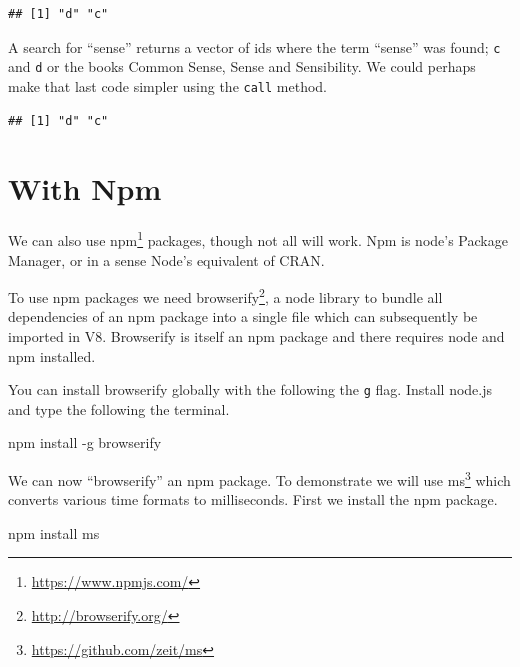 \documentclass[
]{krantz}
\makeatletter
\newenvironment{Shaded}{\begin{snugshade}}{\end{snugshade}}
\newcommand{\ExtensionTok}[1]{#1}
\newcommand{\KeywordTok}[1]{\textcolor[rgb]{0.27,0.27,0.27}{\textbf{#1}}}
\newcommand{\NormalTok}[1]{#1}
\newcommand{\OperatorTok}[1]{\textcolor[rgb]{0.43,0.43,0.43}{\textbf{#1}}}
\newcommand{\StringTok}[1]{\textcolor[rgb]{0.5,0.5,0.5}{#1}}
\renewcommand{\href}[2]{#2\footnote{\url{#1}}}
\newenvironment{kframe}{%
\medskip{}
\setlength{\fboxsep}{.8em}
 \def\at@end@of@kframe{}%
 \ifinner\ifhmode%
  \def\at@end@of@kframe{\end{minipage}}%
  \begin{minipage}{\columnwidth}%
 \fi\fi%
 \def\FrameCommand##1{\hskip\@totalleftmargin \hskip-\fboxsep
 \colorbox{shadecolor}{##1}\hskip-\fboxsep
     \hskip-\linewidth \hskip-\@totalleftmargin \hskip\columnwidth}%
 \MakeFramed {\advance\hsize-\width
   \@totalleftmargin\z@ \linewidth\hsize
   \@setminipage}}%
 {\par\unskip\endMakeFramed%
 \at@end@of@kframe}
\renewenvironment{Shaded}{\begin{kframe}}{\end{kframe}}
\makeatother
\begin{document}
\begin{verbatim}
## [1] "d" "c"
\end{verbatim}

A search for ``sense'' returns a vector of ids where the term ``sense'' was found; \texttt{c} and \texttt{d} or the books Common Sense, Sense and Sensibility. We could perhaps make that last code simpler using the \texttt{call} method.

\begin{Shaded}
\end{Shaded}

\begin{verbatim}
## [1] "d" "c"
\end{verbatim}

\hypertarget{with-npm}{%
\section{With Npm}\label{with-npm}}

We can also use \href{https://www.npmjs.com/}{npm} packages, though not all will work. Npm is node's Package Manager, or in a sense Node's equivalent of CRAN.

To use npm packages we need \href{http://browserify.org/}{browserify}, a node library to bundle all dependencies of an npm package into a single file which can subsequently be imported in V8. Browserify is itself an npm package and there requires node and npm installed.

You can install browserify globally with the following the \texttt{g} flag. Install node.js and type the following the terminal.

\begin{Shaded}
\begin{Highlighting}[]
\ExtensionTok{npm}\NormalTok{ install {-}g browserify}
\end{Highlighting}
\end{Shaded}

We can now ``browserify'' an npm package. To demonstrate we will use \href{https://github.com/zeit/ms}{ms} which converts various time formats to milliseconds. First we install the npm package.

\begin{Shaded}
\begin{Highlighting}[]
\ExtensionTok{npm}\NormalTok{ install ms}
\end{Highlighting}
\end{Shaded}
\end{document}
